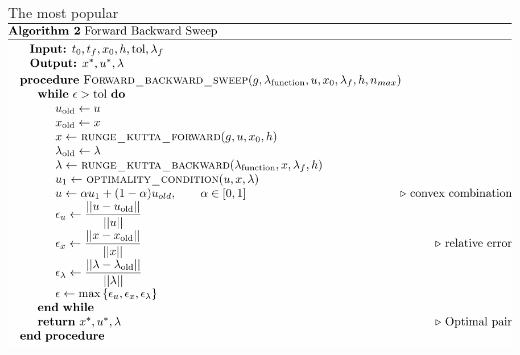 	\begin{frame}{The most popular}
		\includegraphics[width=1\linewidth]{Feathergraphics/fbs_algorithm.pdf}
	\end{frame}
	
